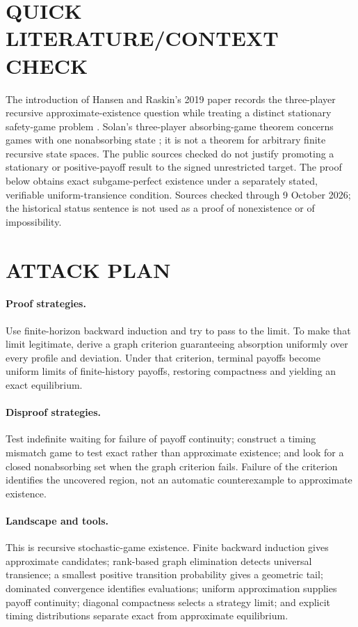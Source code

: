 \documentclass[11pt,a4paper]{article}
\theoremstyle{definition}
\theoremstyle{remark}
\begin{document}
\section{QUICK LITERATURE/CONTEXT CHECK}
The introduction of Hansen and Raskin's 2019 paper records the three-player recursive approximate-existence question while treating a distinct stationary safety-game problem \cite{c735-hr}. Solan's three-player absorbing-game theorem concerns games with one nonabsorbing state \cite{c735-solan}; it is not a theorem for arbitrary finite recursive state spaces. The public sources checked do not justify promoting a stationary or positive-payoff result to the signed unrestricted target. The proof below obtains exact subgame-perfect existence under a separately stated, verifiable uniform-transience condition. Sources checked through 9 October 2026; the historical status sentence is not used as a proof of nonexistence or of impossibility.

\section{ATTACK PLAN}
\paragraph{Proof strategies.}
Use finite-horizon backward induction and try to pass to the limit. To make that limit legitimate, derive a graph criterion guaranteeing absorption uniformly over every profile and deviation. Under that criterion, terminal payoffs become uniform limits of finite-history payoffs, restoring compactness and yielding an exact equilibrium.

\paragraph{Disproof strategies.}
Test indefinite waiting for failure of payoff continuity; construct a timing mismatch game to test exact rather than approximate existence; and look for a closed nonabsorbing set when the graph criterion fails. Failure of the criterion identifies the uncovered region, not an automatic counterexample to approximate existence.

\paragraph{Landscape and tools.}
This is recursive stochastic-game existence. Finite backward induction gives approximate candidates; rank-based graph elimination detects universal transience; a smallest positive transition probability gives a geometric tail; dominated convergence identifies evaluations; uniform approximation supplies payoff continuity; diagonal compactness selects a strategy limit; and explicit timing distributions separate exact from approximate equilibrium.
\end{document}
